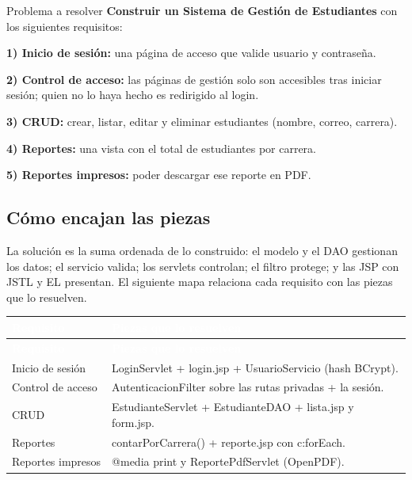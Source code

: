 \documentclass[11pt]{article}
\begin{document}
\begin{cajaproblema}{Problema a resolver}
\textbf{Construir un Sistema de Gestión de Estudiantes} con los siguientes requisitos:\par
\textbf{1) Inicio de sesión:} una página de acceso que valide usuario y contraseña.\par
\textbf{2) Control de acceso:} las páginas de gestión solo son accesibles tras iniciar sesión; quien no lo haya hecho es redirigido al login.\par
\textbf{3) CRUD:} crear, listar, editar y eliminar estudiantes (nombre, correo, carrera).\par
\textbf{4) Reportes:} una vista con el total de estudiantes por carrera.\par
\textbf{5) Reportes impresos:} poder descargar ese reporte en PDF.\par
\end{cajaproblema}
\subsection{Cómo encajan las piezas}
La solución es la suma ordenada de lo construido: el modelo y el DAO gestionan los datos; el servicio valida; los servlets controlan; el filtro protege; y las JSP con JSTL y EL presentan. El siguiente mapa relaciona cada requisito con las piezas que lo resuelven.

{\renewcommand{\arraystretch}{1.25}
\begin{longtable}{>{\raggedright\arraybackslash}p{3.4cm} >{\raggedright\arraybackslash}p{12cm}}
\rowcolor{jwebazul}\textcolor{white}{\textbf{Requisito}} & \textcolor{white}{\textbf{Piezas que lo resuelven}} \\
\endfirsthead
\rowcolor{jwebazul}\textcolor{white}{\textbf{Requisito}} & \textcolor{white}{\textbf{Piezas que lo resuelven}} \\
\endhead
\ttfamily\color{jwebazul}Inicio de sesión & LoginServlet + login.jsp + UsuarioServicio (hash BCrypt). \\ \hline
\ttfamily\color{jwebazul}Control de acceso & AutenticacionFilter sobre las rutas privadas + la sesión. \\ \hline
\ttfamily\color{jwebazul}CRUD & EstudianteServlet + EstudianteDAO + lista.jsp y form.jsp. \\ \hline
\ttfamily\color{jwebazul}Reportes & contarPorCarrera() + reporte.jsp con c:forEach. \\ \hline
\ttfamily\color{jwebazul}Reportes impresos & @media print y ReportePdfServlet (OpenPDF). \\ \hline
\end{longtable}}
\end{document}
